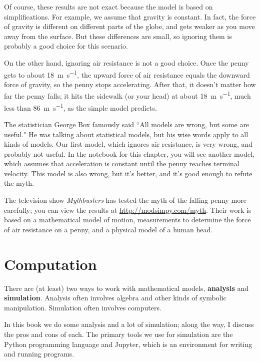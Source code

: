 \documentclass[12pt]{book}
\theoremstyle{exercise}
\begin{document}
Of course, these results are not exact because the model is based on simplifications.  For example, we assume that gravity is constant.  In fact, the force of gravity is different on different parts of the globe, and gets weaker as you move away from the surface.  But these differences are small, so ignoring them is probably a good choice for this scenario.

On the other hand, ignoring air resistance is not a good choice.  Once the penny gets to about \SI{18}{\meter\per\second}, the upward force of air resistance equals the downward force of gravity, so the penny stops accelerating.  After that, it doesn't matter how far the penny falls; it hits the sidewalk (or your head) at about \SI{18}{\meter\per\second}, much less than \SI{86}{\meter\per\second}, as the simple model predicts.

The statistician George Box famously said ``All models are wrong, but some are useful."  He was talking about statistical models, but his wise words apply to all kinds of models.  Our first model, which ignores air resistance, is very wrong, and probably not useful.  In the notebook for this chapter, you will see another model, which assumes that acceleration is constant until the penny reaches terminal velocity.  This model is also wrong, but it's better, and it's good enough to refute the myth.


The television show {\it Mythbusters} has tested the myth of the falling penny more carefully; you can view the results at \url{http://modsimpy.com/myth}.  Their work is based on a mathematical model of motion, measurements to determine the force of air resistance on a penny, and a physical model of a human head.



\section{Computation}
\label{computation}

There are (at least) two ways to work with mathematical models, {\bf analysis} and {\bf simulation}.  Analysis often involves algebra and other kinds of symbolic manipulation.  Simulation often involves computers.

In this book we do some analysis and a lot of simulation; along the way, I discuss the pros and cons of each.  The primary tools we use for simulation are the Python programming language and Jupyter, which is an environment for writing and running programs.
\end{document}
